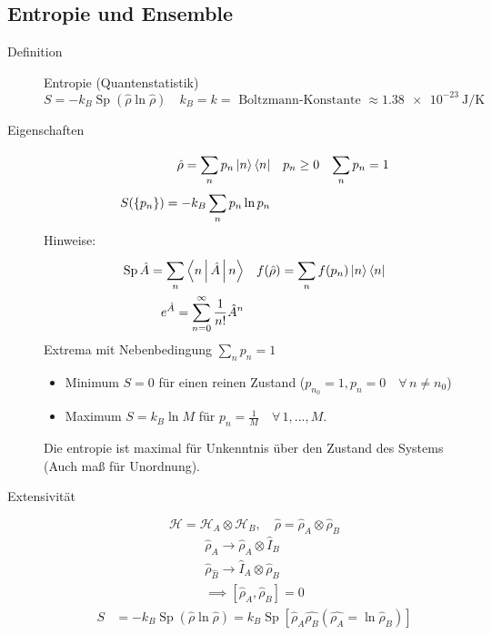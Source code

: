 \documentclass[11pt]{article}
\theoremstyle{plain}
\newcommand{\oo}{\infty}
\begin{document}
\subsection*{Entropie und Ensemble}
\begin{description}
  \item[Definition] Entropie (Quantenstatistik) \\
    \[ S =-k_B \operatorname{Sp}(\hat{\rho} \ln{\hat{\rho}}) \quad k_B = k = 
      \text{ Boltzmann-Konstante }
    \approx \SI{1,38e-23}{\joule\per\kelvin} \] 
  \item[Eigenschaften] 
    \begin{align*}
      \hat{\rho} = \sum_{n}^{} p_n \Ket{n}\Bra{n} && p_n \ge 0 && \sum_{n}^{} p_n = 1 \\
      S(\left\{ p_n \right\}) = -k_B \sum_{n}^{} p_n \ln{p_n}
    \end{align*}
    Hinweise: \begin{align*}
      \operatorname{Sp} \hat{A} = \sum_{n}^{}\Braket{n | \hat{A}|n} && f(\hat{\rho})= 
      \sum_{n}^{} f( p_n) \Ket{n}\Bra{n} \\
      e^{\hat{A}}= \sum_{n=0}^{ \oo } \frac{1}{n!}\hat{A}^n
    \end{align*}
    Extrema mit Nebenbedingung $\sum_{n}^{} p_n = 1$
    \begin{itemize}
      \item Minimum $S=0$ f\"ur einen reinen Zustand ($p_{n_0}=1, p_n =0
        \quad\forall\, n \neq n_0$)
      \item Maximum $S= k_B \ln{M}$ f\"ur $p_n = \frac{1}{M} \quad\forall\, 1,...,M$.
    \end{itemize}
    Die entropie ist maximal f\"ur Unkenntnis \"uber den Zustand des Systems
    (Auch ma\ss{} f\"ur Unordnung).
  \item[Extensivit\"at] \[ \mathcal{H}= \mathcal{H}_A \otimes \mathcal{H}_B,
  \quad \hat{\rho} = \hat{\rho}_A \otimes  \hat{\rho}_B \] 
  \begin{align*}
    \hat{\rho}_A \to  \hat{\rho}_A \otimes  \hat{I}_B  \\
    \hat{\rho}_{\hat{B}} \to  \hat{I}_A \otimes  \hat{\rho}_B \\
    \implies \left[ \hat{\rho}_A, \hat{\rho}_B  \right]= 0
  \end{align*}
  \begin{align*}
    S & = -k_B \operatorname{Sp} ( \hat{\rho} \ln{\hat{\rho}}) = k_B \operatorname{Sp}
    \left[ \hat{\rho}_A \hat{\rho_B} (\hat{\rho_A} = \ln{\hat{\rho}_B}) \right] \\

\end{align*}
\end{description}
\end{document}
